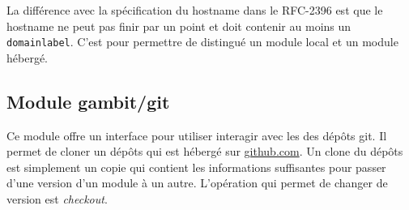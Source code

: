 La différence avec la spécification du hostname dans le RFC-2396
est que le hostname ne peut pas finir par un point et doit contenir
au moins un \verb|domainlabel|. C'est pour permettre de distingué
un module local et un module hébergé.

\subsection{Module gambit/git}

Ce module offre un interface pour utiliser interagir avec les des dépôts git.
Il permet de cloner un dépôts qui est hébergé sur \url{github.com}. Un clone du
dépôts est simplement un copie qui contient les informations suffisantes pour
passer d'une version d'un module à un autre. L'opération qui permet de changer
de version est \emph{checkout}.


%
%
%
%
%
%
%
%
%
%
%
%
%
%
%
%
%
%
%


